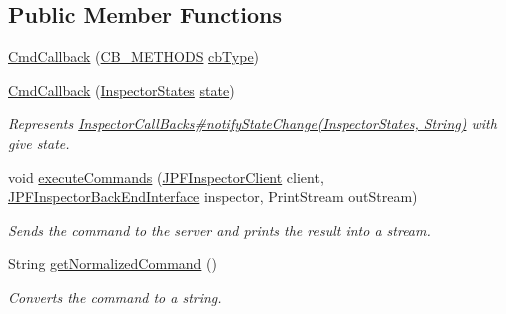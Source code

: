 \subsection*{Public Member Functions}
\begin{DoxyCompactItemize}
\item 
\hyperlink{classgov_1_1nasa_1_1jpf_1_1inspector_1_1client_1_1commands_1_1_cmd_callback_ac27d9e27a01f135eb95bf41510ee49f0}{Cmd\+Callback} (\hyperlink{enumgov_1_1nasa_1_1jpf_1_1inspector_1_1interfaces_1_1_inspector_call_backs_1_1_c_b___m_e_t_h_o_d_s}{C\+B\+\_\+\+M\+E\+T\+H\+O\+DS} \hyperlink{classgov_1_1nasa_1_1jpf_1_1inspector_1_1client_1_1commands_1_1_cmd_callback_a3fdc749dfa288c4bd4a72b5235539e91}{cb\+Type})
\item 
\hyperlink{classgov_1_1nasa_1_1jpf_1_1inspector_1_1client_1_1commands_1_1_cmd_callback_a3379b9499c49ae1068e15a7eac14ffd1}{Cmd\+Callback} (\hyperlink{enumgov_1_1nasa_1_1jpf_1_1inspector_1_1interfaces_1_1_commands_interface_1_1_inspector_states}{Inspector\+States} \hyperlink{classgov_1_1nasa_1_1jpf_1_1inspector_1_1client_1_1commands_1_1_cmd_callback_a565db0f21a577f23952aaa47706b7cbd}{state})
\begin{DoxyCompactList}\small\item\em Represents \hyperlink{}{Inspector\+Call\+Backs\#notify\+State\+Change(\+Inspector\+States, String)} with give state. \end{DoxyCompactList}\item 
void \hyperlink{classgov_1_1nasa_1_1jpf_1_1inspector_1_1client_1_1commands_1_1_cmd_callback_a13b9daf40fc9ce77e2fa4d659f9766d1}{execute\+Commands} (\hyperlink{classgov_1_1nasa_1_1jpf_1_1inspector_1_1client_1_1_j_p_f_inspector_client}{J\+P\+F\+Inspector\+Client} client, \hyperlink{interfacegov_1_1nasa_1_1jpf_1_1inspector_1_1interfaces_1_1_j_p_f_inspector_back_end_interface}{J\+P\+F\+Inspector\+Back\+End\+Interface} inspector, Print\+Stream out\+Stream)
\begin{DoxyCompactList}\small\item\em Sends the command to the server and prints the result into a stream. \end{DoxyCompactList}\item 
String \hyperlink{classgov_1_1nasa_1_1jpf_1_1inspector_1_1client_1_1commands_1_1_cmd_callback_a39d7b1f30db4370a20318d932f4aa078}{get\+Normalized\+Command} ()
\begin{DoxyCompactList}\small\item\em Converts the command to a string. \end{DoxyCompactList}\item 

\end{DoxyCompactItemize}
